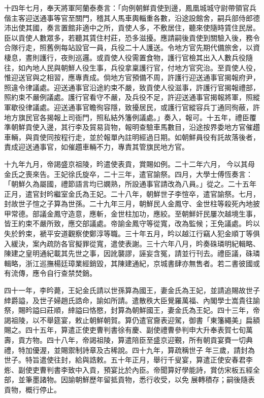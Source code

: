 \begin{pinyinscope}
十四年七月，奉天將軍阿蘭泰奏言：「向例朝鮮貢使到邊，鳳凰城城守尉帶領官兵偕主客迎送通事等官至關門，稽其人馬車輿輜重各數，沿途設館舍，嗣兵部侍郎德沛出使其國，奏言置館非適中之所，貢使人多，不敷居住，聽來使隨時賃住民居。臣以貢使人數眾多，若聽其賃住村莊，恐多滋擾。應請嗣後貢使到關驗入後，務令合隊行走，照舊例每站設官一員，兵役二十人護送。令地方官先期代備旅舍，以資棲息，晝則護行，夜則巡邏。或貢使人役需置食物，護行官檢其出入人數兵役隨往，如內地人民與朝鮮人役生事，兵役拿稟護行官，付地方官究治。至貢使人役，惟迎送官與之相習，應專責成。倘地方官預備不周，許護行迎送通事官揭報府尹，照違令律議處。迎送通事官沿途約束不嚴，致貢使人役滋事，許護行官揭報禮部，照約束不嚴例議處。護行官看守不嚴，及兵役不足，許迎送通事官揭報將軍，照縱軍歇役律議處。迎送通事官瞻徇容隱，致擾居民，或護行官縱容兵丁通同徇蔽，許地方旗民官各揭報上司衙門，照私結外籓例議處。」奏入，報可。十五年，禮臣覆準朝鮮貢使入邊，其行李及貿易貨物，報明查驗車馬數目，沿途按界委地方官催趲車輛，與貢使同按程行走，並於報單內註明經過日期。如朝鮮員役有託故落後者，責成迎送通事官，如催趲車輛不力，專責其管旗民地方官。

十九年九月，帝謁盛京祖陵，昑遣使表貢，賞賜如例。二十二年六月，今以其母金氏之喪來告。王妃徐氏旋卒，二十三年，遣官諭祭。四月，大學士傅恆奏言：「朝鮮久為屬國，禮節語言均已嫻熟，所設通事官請改為八員。」從之。二十五年正月，遣官封昑繼室金氏為王妃。二十八年，朝鮮世子李愃卒，遣官諭祭。七月，封故世子愃之子算為世孫。二十九年三月，朝鮮民人金鳳守、金世柱等殺死內地披甲常德。部議金鳳守造意，應斬，金世柱加功，應絞。至朝鮮奸民屢次越境生事，皆王約束不嚴所致，應交部議處。帝諭金鳳守等從寬，改為監候；王免議處。昑以失於鈐束，褫平安道觀察使鄭淳等職。三十年五月，昑以越江行竊人犯金順丁等俱入緩決，案內疏防各官擬罪從寬，遣使表謝。三十六年八月，昑奏硃璘明紀輯略、陳建之皇明通紀載其先世之事，因訛襲謬，誣妄含冤，請並行刊去。禮臣議，硃璘輯略，浙江巡撫楊廷璋業經銷毀，其陳建通紀，京城書肆亦無售者。若二書彼國或有流傳，應令自行查禁焚銷。

四十一年，李昑薨，王妃金氏請以世孫算為國王，妻金氏為王妃，並請追賜故世子緈爵謚，及世子婦趙氏誥命，諭如所請。遣散秩大臣覺羅萬福、內閣學士嵩貴往諭祭，賜昑謚曰莊順，緈謚曰恪愍，封算為朝鮮國王，妻金氏為王妃。四十三年，帝謁祖陵，以不舉筵宴，敕止朝鮮朝賀。算仍遣官齎表迎駕，御書「東籓繩美」扁額賜之。四十五年，算遣正使吏曹判書徐有慶、副使禮曹參判申大升奉表賀七旬萬壽，貢方物。四十八年，帝謁祖陵，算遣陪臣至盛京迎覲，所有朝貢宴賚一切典禮，特加優渥，並賜禦制詩章及古稀說。四十九年，算疏稱世子年三歲，請封為世子。特旨遣使往封，給與誥敕。五十年正月，舉行千叟宴，算遣正使安春君李烿、副使吏曹判書李致中入貢，預宴比於內臣。帝聞算好學能詩，賞仿宋板五經全部，並筆墨諸物。因諭朝鮮歷年留抵貢物，悉行收受，以免展轉積存；嗣後隨表貢物，概行停止。


\end{pinyinscope}

